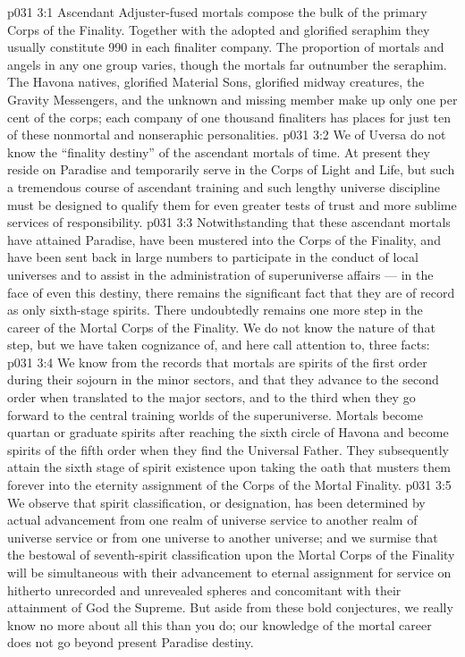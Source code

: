 \vs p031 3:1 Ascendant Adjuster\hyp{}fused mortals compose the bulk of the primary Corps of the Finality. Together with the adopted and glorified seraphim they usually constitute 990 in each finaliter company. The proportion of mortals and angels in any one group varies, though the mortals far outnumber the seraphim. The Havona natives, glorified Material Sons, glorified midway creatures, the Gravity Messengers, and the unknown and missing member make up only one per cent of the corps; each company of one thousand finaliters has places for just ten of these nonmortal and nonseraphic personalities.
\vs p031 3:2 We of Uversa do not know the “finality destiny” of the ascendant mortals of time. At present they reside on Paradise and temporarily serve in the Corps of Light and Life, but such a tremendous course of ascendant training and such lengthy universe discipline must be designed to qualify them for even greater tests of trust and more sublime services of responsibility.
\vs p031 3:3 \pc Notwithstanding that these ascendant mortals have attained Paradise, have been mustered into the Corps of the Finality, and have been sent back in large numbers to participate in the conduct of local universes and to assist in the administration of superuniverse affairs --- in the face of even this  destiny, there remains the significant fact that they are of record as only sixth\hyp{}stage spirits. There undoubtedly remains one more step in the career of the Mortal Corps of the Finality. We do not know the nature of that step, but we have taken cognizance of, and here call attention to, three facts:
\vs p031 3:4 \pc {}\bibnobreakspace We know from the records that mortals are spirits of the first order during their sojourn in the minor sectors, and that they advance to the second order when translated to the major sectors, and to the third when they go forward to the central training worlds of the superuniverse. Mortals become quartan or graduate spirits after reaching the sixth circle of Havona and become spirits of the fifth order when they find the Universal Father. They subsequently attain the sixth stage of spirit existence upon taking the oath that musters them forever into the eternity assignment of the Corps of the Mortal Finality.
\vs p031 3:5 We observe that spirit classification, or designation, has been determined by actual advancement from one realm of universe service to another realm of universe service or from one universe to another universe; and we surmise that the bestowal of seventh\hyp{}spirit classification upon the Mortal Corps of the Finality will be simultaneous with their advancement to eternal assignment for service on hitherto unrecorded and unrevealed spheres and concomitant with their attainment of God the Supreme. But aside from these bold conjectures, we really know no more about all this than you do; our knowledge of the mortal career does not go beyond present Paradise destiny.
